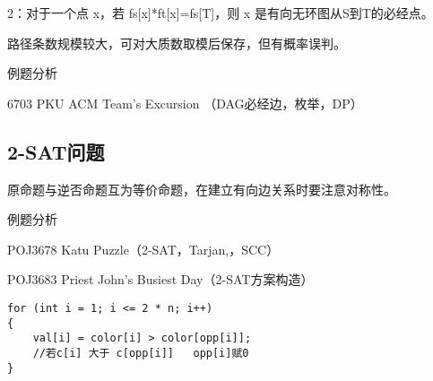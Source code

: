     2：对于一个点 x，若 fs[x]*ft[x]=fs[T]，则 x 是有向无环图从S到T的必经点。

    路径条数规模较大，可对大质数取模后保存，但有概率误判。


例题分析

6703 PKU ACM Team's Excursion （DAG必经边，枚举，DP）

\subsection{2-SAT问题}

原命题与逆否命题互为等价命题，在建立有向边关系时要注意对称性。

例题分析

POJ3678 Katu Puzzle（2-SAT，Tarjan,，SCC）

POJ3683 Priest John's Busiest Day（2-SAT方案构造）

\begin{lstlisting}
for (int i = 1; i <= 2 * n; i++)
{
    val[i] = color[i] > color[opp[i]];
    //若c[i] 大于 c[opp[i]]   opp[i]赋0 
}
\end{lstlisting}
    